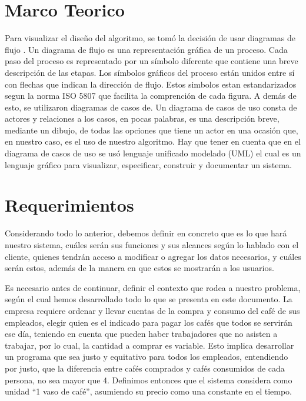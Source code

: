 \documentclass[twocolumn,11pts]{IEEEtran}
\begin{document}
\section{Marco Teorico}

Para visualizar el diseño del algoritmo, se tomó la decisión de usar diagramas de flujo . Un diagrama de flujo es una representación gráfica de un proceso. Cada paso del proceso es representado por un símbolo diferente que  contiene una breve descripción de las etapas. Los símbolos gráficos del proceso están unidos entre sí con flechas que indican la dirección de flujo. Estos simbolos estan estandarizados segun la norma ISO 5807 que facilita la comprención de cada figura.
A demás de esto, se utilizaron diagramas de casos de. Un diagrama de casos de uso consta de actores y relaciones a los casos, en pocas palabras, es una descripción breve, mediante un dibujo, de todas las opciones que tiene un actor en una ocasión que, en nuestro caso, es el uso de nuestro algoritmo. Hay que tener en cuenta que en el diagrama de casos de uso se usó lenguaje unificado modelado (UML) el cual es un lenguaje gráfico para visualizar, especificar, construir y documentar un sistema.

\section{Requerimientos}

Considerando todo lo anterior, debemos definir en concreto que es lo que hará nuestro sistema, cuáles serán sus funciones y sus alcances según lo hablado con el cliente, quienes tendrán acceso a modificar o agregar los datos necesarios, y cuáles serán estos, además de la manera en que estos se mostrarán a los usuarios.

Es necesario antes de continuar, definir el contexto que rodea a nuestro problema, según el cual hemos desarrollado todo lo que se presenta en este documento. La empresa requiere ordenar y llevar cuentas de la compra y consumo del café de sus empleados, elegir quien es el indicado para pagar los cafés que todos se servirán ese día, teniendo en cuenta que pueden haber trabajadores que no asisten a trabajar, por lo cual, la cantidad a comprar es variable. Esto implica desarrollar un programa que sea justo y equitativo para todos los empleados, entendiendo por justo, que la diferencia entre cafés comprados y cafés consumidos de cada persona, no sea mayor que 4. Definimos entonces que el sistema considera como unidad “1 vaso de café”, asumiendo su precio como una constante en el tiempo.
\end{document}
